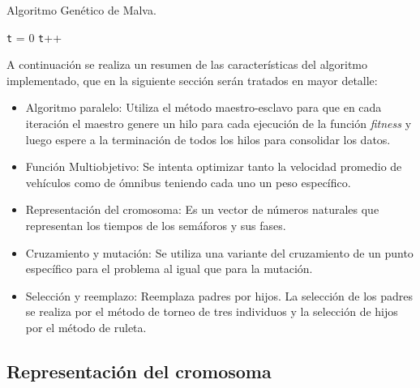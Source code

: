 \begin{algorithm}[H]
	\caption{Algoritmo Genético de Malva. }
	\label{alg:algoritmo_genetico_malva}
	\begin{algorithmic} [1] 
		{
			\STATE \texttt{t} = 0
			\STATE \texttt{t}++		
			\ENDWHILE
		}
	\end{algorithmic}
	
\end{algorithm}

A continuación se realiza un resumen de las características del algoritmo implementado, que en la siguiente sección serán tratados en mayor detalle:
\begin{itemize}

\item Algoritmo paralelo: Utiliza el método maestro-esclavo para que en cada iteración el maestro genere un hilo para cada ejecución  de la función \emph{fitness} y luego espere a la terminación de todos los hilos para consolidar los datos. 
\item Función Multiobjetivo: Se intenta optimizar tanto la velocidad promedio de vehículos como de ómnibus teniendo cada uno un peso específico.
\item Representación del cromosoma: Es un vector de números naturales que representan los tiempos de los semáforos y sus fases.
\item Cruzamiento y mutación: Se utiliza una variante del cruzamiento de un punto específico para el problema al igual que para la mutación.
\item Selección y reemplazo: Reemplaza padres por hijos. La selección de los padres se realiza por el método de torneo de tres individuos y la selección de hijos por el método de ruleta.

\end{itemize}

\subsection{Representación del cromosoma}

